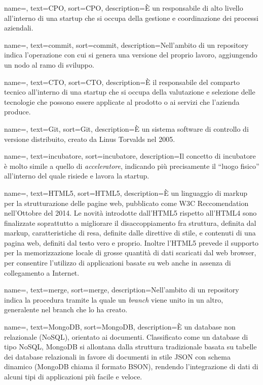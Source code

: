 {
    name=,
    text=CPO,
    sort=CPO,
    description={È un responsabile di alto livello all'interno di una startup che si occupa della gestione e coordinazione dei processi aziendali.}
}

{
    name=,
    text=commit,
    sort=commit,
    description={Nell'ambito di un repository indica l'operazione con cui si genera una versione del proprio lavoro, aggiungendo un nodo al ramo di sviluppo.}
}

{
    name=,
    text=CTO,
    sort=CTO,
    description={È il responsabile del comparto tecnico all'interno di una startup che si occupa della valutazione e selezione delle tecnologie che possono essere applicate al prodotto o ai servizi che l'azienda produce.}
}

{
    name=,
    text=Git,
    sort=Git,
    description={È un sistema software di controllo di versione distribuito, creato da Linus Torvalds nel 2005.}
}

{
    name=,
    text=incubatore,
    sort=incubatore,
    description={Il concetto di incubatore è molto simile a quello di \textit{acceleratore}, indicando più precisamente il ``luogo fisico'' all'interno del quale risiede e lavora la startup.}
}

{
    name=,
    text=HTML5,
    sort=HTML5,
    description={È un linguaggio di markup per la strutturazione delle pagine web, pubblicato come W3C Reccomendation nell'Ottobre del 2014. Le novità introdotte dall'HTML5 rispetto all'HTML4 sono finalizzate soprattutto a migliorare il disaccoppiamento fra struttura, definita dal markup, caratteristiche di resa, definite dalle direttive di stile, e contenuti di una pagina web, definiti dal testo vero e proprio. Inoltre l'HTML5 prevede il supporto per la memorizzazione locale di grosse quantità di dati scaricati dal web browser, per consentire l'utilizzo di applicazioni basate su web anche in assenza di collegamento a Internet.}
}

{
    name=,
    text=merge,
    sort=merge,
    description={Nell'ambito di un repository indica la procedura tramite la quale un \textit{branch} viene unito in un altro, generalente nel branch che lo ha creato.}
}

{
    name=,
    text=MongoDB,
    sort=MongoDB,
    description={È un database non relazionale (NoSQL), orientato ai documenti. Classificato come un database di tipo NoSQL, MongoDB si allontana dalla struttura tradizionale basata su tabelle dei database relazionali in favore di documenti in stile JSON con schema dinamico (MongoDB chiama il formato BSON), rendendo l'integrazione di dati di alcuni tipi di applicazioni più facile e veloce.}
}

